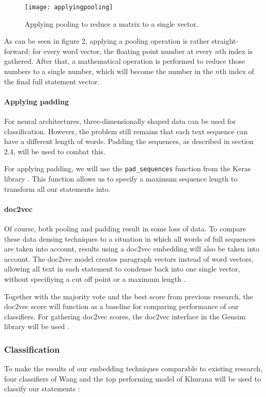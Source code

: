 \begin{figure}[h]
    \centering
    \texttt{[image: applyingpooling]}
    \caption{Applying pooling to reduce a matrix to a single vector.}
\end{figure}

As can be seen in figure 2, applying a pooling operation is rather straight-forward: for every word vector, the floating point number at every $n$th index is gathered.
After that, a mathematical operation is performed to reduce those numbers to a single number, which will become the number in the $n$th index of the final full statement vector.

\paragraph{Applying padding}
For neural architectures, three-dimensionally shaped data can be used for classification. 
However, the problem still remains that each text sequence can have a different length of words. 
Padding the sequences, as described in section 2.4, will be used to combat this.

For applying padding, we will use the \texttt{pad\_sequences} function from the Keras library \cite{keraspad}. 
This function allows us to specify a maximum sequence length to transform all our statements into.

\paragraph{doc2vec}
Of course, both pooling and padding result in some loss of data.
To compare these data densing techniques to a situation in which all words of full sequences are taken into account, results using a doc2vec embedding will also be taken into account.
The doc2vec model creates paragraph vectors instead of word vectors, allowing all text in each statement to condense back into one single vector, without specifiying a cut off point or a maximum length \cite{le2014}.

Together with the majority vote and the best score from previous research, the doc2vec score will function as a baseline for comparing performance of our classifiers.
For gathering doc2vec scores, the doc2vec interface in the Gensim library will be used \cite{gensim}. 

\subsubsection{Classification}
To make the results of our embedding techniques comparable to existing research, four classifiers of Wang and the top performing model of Khurana will be used to classify our statements \cite{wang2018}\cite{khurana2017}:

